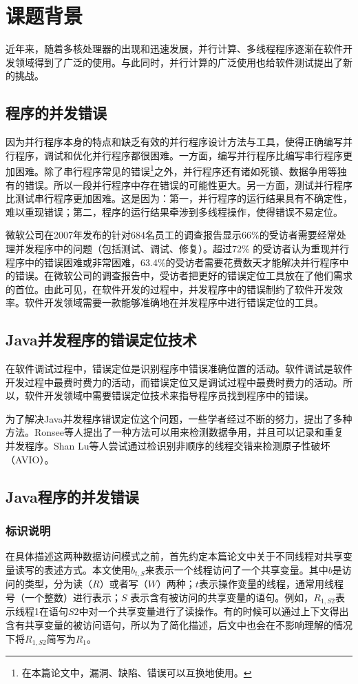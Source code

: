 ﻿\section{课题背景}
近年来，随着多核处理器的出现和迅速发展，并行计算、多线程程序逐渐在软件开发领域得到了广泛的使用。与此同时，并行计算的广泛使用也给软件测试提出了新的挑战。
\subsection{程序的并发错误}
因为并行程序本身的特点和缺乏有效的并行程序设计方法与工具，使得正确编写并行程序，调试和优化并行程序都很困难。一方面，编写并行程序比编写串行程序更加困难。除了串行程序常见的错误\footnote{在本篇论文中，漏洞、缺陷、错误可以互换地使用。}之外，并行程序还有诸如死锁、数据争用等独有的错误。所以一段并行程序中存在错误的可能性更大。另一方面，测试并行程序比测试串行程序更加困难。这是因为：第一，并行程序的运行结果具有不确定性，难以重现错误；第二，程序的运行结果牵涉到多线程操作，使得错误不易定位\cite{mcdowell1989debugging}。\par
微软公司在2007年发布的针对684名员工的调查报告显示66\%的受访者需要经常处理并发程序中的问题（包括测试、调试、修复）。超过72\% 的受访者认为重现并行程序中的错误困难或非常困难，63.4\%的受访者需要花费数天才能解决并行程序中的错误。在微软公司的调查报告中，受访者把更好的错误定位工具放在了他们需求的首位\cite{godefroid2008concurrency}。由此可见，在软件开发的过程中，并发程序中的错误制约了软件开发效率。软件开发领域需要一款能够准确地在并发程序中进行错误定位的工具。
\subsection{Java并发程序的错误定位技术}
在软件调试过程中，错误定位是识别程序中错误准确位置的活动。软件调试是软件开发过程中最费时费力的活动，而错误定位又是调试过程中最费时费力的活动。所以，软件开发领域中需要错误定位技术来指导程序员找到程序中的错误\cite{wong2009survey}。\par
为了解决Java并发程序错误定位这个问题，一些学者经过不断的努力，提出了多种方法。Ronsee等人提出了一种方法可以用来检测数据争用，并且可以记录和重复并发程序\cite{RecPlay}。Shan Lu等人尝试通过检识别非顺序的线程交错来检测原子性破坏（AVIO）\cite{AVIO}。
\subsection{Java程序的并发错误}
\subsubsection{标识说明}
在具体描述这两种数据访问模式之前，首先约定本篇论文中关于不同线程对共享变量读写的表述方式。本文使用$b_{t,S}$来表示一个线程访问了一个共享变量。其中$b$是访问的类型，分为读（$R$）或者写（$W$）两种；$t$表示操作变量的线程，通常用线程号（一个整数）进行表示；$S$ 表示含有被访问的共享变量的语句。例如，$R_{1,S2}$表示线程1在语句$S2$中对一个共享变量进行了读操作。有的时候可以通过上下文得出含有共享变量的被访问语句，所以为了简化描述，后文中也会在不影响理解的情况下将$R_{1,S2}$简写为$R_1$。
